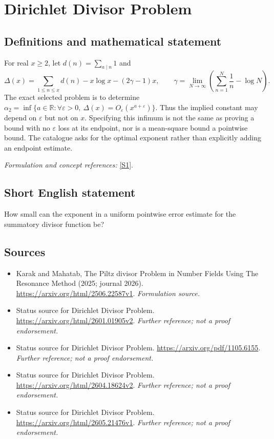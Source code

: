\documentclass[11pt]{article}
\begin{document}
\section*{\texorpdfstring{Dirichlet Divisor Problem}{Dirichlet Divisor Problem}}\label{170}
\subsection{Definitions and mathematical statement}
For real $x\ge2$, let $d(n)=\sum_{a\mid n}1$ and
\[
 \Delta(x)=\sum_{1\le n\le x}d(n)-x\log x-(2\gamma-1)x,
 \qquad \gamma=\lim_{N\to\infty}\left(\sum_{n=1}^N\frac1n-\log N\right).
\]
The exact selected problem is to determine
$\alpha_2=\inf\{a\in{\mathbb{R}}:\forall{\varepsilon}>0,\ \Delta(x)=O_{\varepsilon}(x^{a+{\varepsilon}})\}$.
Thus the implied constant may depend on ${\varepsilon}$ but not on $x$. Specifying this infimum is not the same as proving a bound with no ${\varepsilon}$ loss at its endpoint, nor is a mean-square bound a pointwise bound. The catalogue asks for the optimal exponent rather than explicitly adding an endpoint estimate.
\par\smallskip\textit{Formulation and concept references:} \href{https://arxiv.org/html/2506.22587v1}{[S1]}.

\subsection{Short English statement}
How small can the exponent in a uniform pointwise error estimate for the summatory divisor function be?
\subsection{Sources}
\begin{itemize}
\item[S1]Karak and Mahatab, The Piltz divisor Problem in Number Fields Using The Resonance Method (2025; journal 2026).
\url{https://arxiv.org/html/2506.22587v1}.
\textit{Formulation source.}
\item[S2]Status source for Dirichlet Divisor Problem.
\url{https://arxiv.org/html/2601.01905v2}.
\textit{Further reference; not a proof endorsement.}
\item[S3]Status source for Dirichlet Divisor Problem.
\url{https://arxiv.org/pdf/1105.6155}.
\textit{Further reference; not a proof endorsement.}
\item[S4]Status source for Dirichlet Divisor Problem.
\url{https://arxiv.org/html/2604.18624v2}.
\textit{Further reference; not a proof endorsement.}
\item[S5]Status source for Dirichlet Divisor Problem.
\url{https://arxiv.org/html/2605.21476v1}.
\textit{Further reference; not a proof endorsement.}
\end{itemize}
\end{document}
